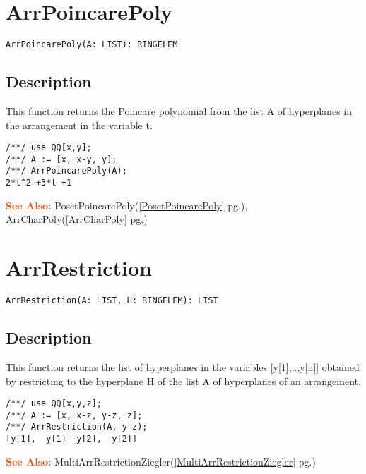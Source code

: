 \documentclass[a4paper]{mybook}
\newenvironment{command}{}{} %
\newcommand\SeeAlso{\par\textcolor{OrangeRed}{\textbf{\large See Also: }}}
\begin{document}
\section{ArrPoincarePoly}
\label{ArrPoincarePoly}
\begin{command} %


\begin{Verbatim}[label=syntax, rulecolor=\color{MidnightBlue},
frame=single]
ArrPoincarePoly(A: LIST): RINGELEM
\end{Verbatim}


\subsection*{Description}

This function returns the Poincare polynomial from the list A of
hyperplanes in the arrangement in the variable t.
\begin{Verbatim}[label=example, rulecolor=\color{PineGreen}, frame=single]
/**/ use QQ[x,y];	
/**/ A := [x, x-y, y];
/**/ ArrPoincarePoly(A);
2*t^2 +3*t +1
\end{Verbatim}


\SeeAlso %
  PosetPoincarePoly(\ref{PosetPoincarePoly} pg.\pageref{PosetPoincarePoly}), 
    ArrCharPoly(\ref{ArrCharPoly} pg.\pageref{ArrCharPoly})
\end{command} %

\section{ArrRestriction}
\label{ArrRestriction}
\begin{command} %


\begin{Verbatim}[label=syntax, rulecolor=\color{MidnightBlue},
frame=single]
ArrRestriction(A: LIST, H: RINGELEM): LIST 
\end{Verbatim}


\subsection*{Description}

This function returns the list of hyperplanes in the variables
[y[1],..,y[n]] obtained by restricting to the hyperplane H of the list A of hyperplanes of an arrangement.
\begin{Verbatim}[label=example, rulecolor=\color{PineGreen}, frame=single]
/**/ use QQ[x,y,z];	
/**/ A := [x, x-z, y-z, z];
/**/ ArrRestriction(A, y-z);
[y[1],  y[1] -y[2],  y[2]]
\end{Verbatim}


\SeeAlso %
  MultiArrRestrictionZiegler(\ref{MultiArrRestrictionZiegler} pg.\pageref{MultiArrRestrictionZiegler})
\end{command} %
\end{document}
